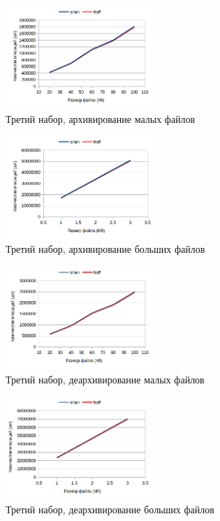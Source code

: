 \documentclass[a4paper,12pt]{article} %
\begin{document}
    \begin{figure}[!htb]
        \caption{Третий набор, архивирование малых файлов}
        \centering
        \includegraphics[width=0.5\textwidth]{graphs/2/3_c_kb}
    \end{figure}
    \begin{figure}[!htb]
        \caption{Третий набор, архивирование больших файлов}
        \centering
        \includegraphics[width=0.5\textwidth]{graphs/2/3_c_mb}
    \end{figure}
    \begin{figure}[!htb]
        \caption{Третий набор, деархивирование малых файлов}
        \centering
        \includegraphics[width=0.5\textwidth]{graphs/2/3_d_kb}
    \end{figure}
    \begin{figure}[!htb]
        \caption{Третий набор, деархивирование больших файлов}
        \centering
        \includegraphics[width=0.5\textwidth]{graphs/2/3_d_mb}
    \end{figure}
\end{document}

